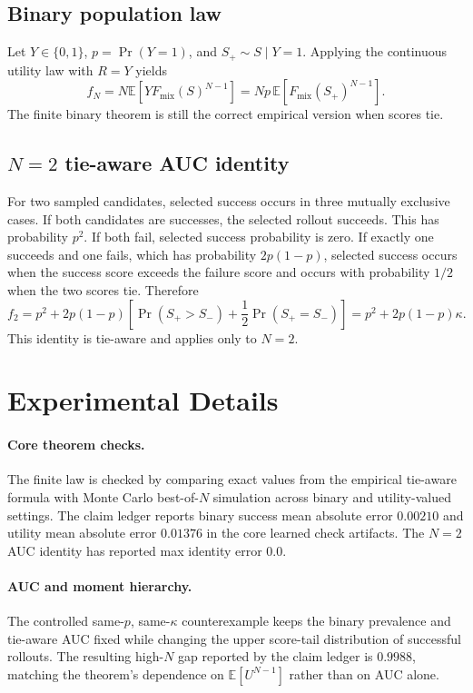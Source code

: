 \subsection{Binary population law}
\label{app:binary-proof}
Let $Y\in\{0,1\}$, $p=\Pr(Y=1)$, and $S_+\sim S\mid Y=1$. Applying the continuous utility law with $R=Y$ yields
\[
f_N
=
N\mathbb{E}\!\left[YF_{\mathrm{mix}}(S)^{N-1}\right]
=
Np\,\mathbb{E}\!\left[F_{\mathrm{mix}}(S_+)^{N-1}\right].
\]
The finite binary theorem is still the correct empirical version when scores tie.

\subsection{\texorpdfstring{$N=2$}{N=2} tie-aware AUC identity}
\label{app:auc-proof}
For two sampled candidates, selected success occurs in three mutually exclusive cases. If both candidates are successes, the selected rollout succeeds. This has probability $p^2$. If both fail, selected success probability is zero. If exactly one succeeds and one fails, which has probability $2p(1-p)$, selected success occurs when the success score exceeds the failure score and occurs with probability $1/2$ when the two scores tie. Therefore
\[
f_2
=
p^2 + 2p(1-p)
\left[
\Pr(S_+>S_-) + \frac{1}{2}\Pr(S_+=S_-)
\right]
=
p^2+2p(1-p)\kappa.
\]
This identity is tie-aware and applies only to $N=2$.

\section{Experimental Details}
\label{app:experiments}

\paragraph{Core theorem checks.}
The finite law is checked by comparing exact values from the empirical tie-aware formula with Monte Carlo best-of-$N$ simulation across binary and utility-valued settings. The claim ledger reports binary success mean absolute error $0.00210$ and utility mean absolute error $0.01376$ in the core learned check artifacts. The $N=2$ AUC identity has reported max identity error $0.0$.

\paragraph{AUC and moment hierarchy.}
The controlled same-$p$, same-$\kappa$ counterexample keeps the binary prevalence and tie-aware AUC fixed while changing the upper score-tail distribution of successful rollouts. The resulting high-$N$ gap reported by the claim ledger is $0.9988$, matching the theorem's dependence on $\mathbb{E}[U^{N-1}]$ rather than on AUC alone.

